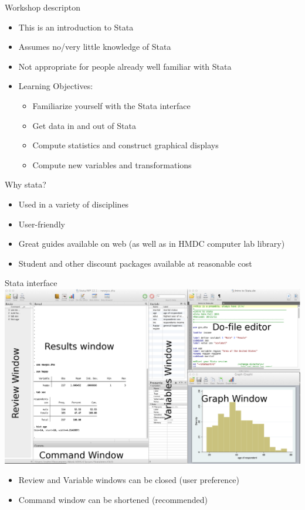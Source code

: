 \documentclass[table,smaller]{beamer}
\begin{document}
\begin{frame}[label=sec-1-3]{Workshop descripton}
\begin{itemize}
\item This is an \alert{introduction} to Stata
\item Assumes no/very little knowledge of Stata
\item Not appropriate for people already well familiar with Stata
\item Learning Objectives:
\begin{itemize}
\item Familiarize yourself with the Stata interface
\item Get data in and out of Stata
\item Compute statistics and construct graphical displays
\item Compute new variables and transformations
\end{itemize}
\end{itemize}
\end{frame}

\begin{frame}[label=sec-1-4]{Why stata?}
\begin{itemize}
\item Used in a variety of disciplines
\item User-friendly
\item Great guides available on web (as well as in HMDC computer lab library)
\item Student and other discount packages available at reasonable cost
\end{itemize}
\end{frame}

\begin{frame}[label=sec-1-5]{Stata interface}
\includegraphics[width=.9\linewidth]{images/StataInterface.png}

\begin{itemize}
\item Review and Variable windows can be closed (user preference)
\item Command window can be shortened (recommended)
\end{itemize}
\end{frame}
\end{document}

